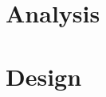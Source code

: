 \documentclass[ twoside,openright,titlepage,numbers=noenddot,headinclude,%
                footinclude=true,cleardoublepage=empty,abstractoff, %
                BCOR=5mm,paper=a4,fontsize=11pt,%
                ngerman,american,%
                ]{scrreprt}
\begin{document}
\chapter{Analysis}
\label{cha:analysis}









\chapter{Design}
\label{cha:design}






%
%
%
%
\end{document}
